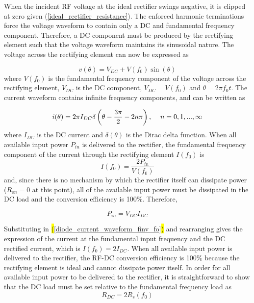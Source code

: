 When the incident RF voltage at the ideal rectifier swings negative, it is clipped at zero given (\ref{ideal_rectifier_resistance}).  The enforced harmonic terminations force the voltage waveform to contain only a DC and fundamental frequency component. Therefore, a DC component must be produced by the rectifying element such that the voltage waveform maintains its sinusoidal nature.  The voltage across the rectifying element can now be expressed as

\begin{equation}\label{diode_voltage_waveform_B}
    v(\theta) = V_{DC} + V(f_0)\sin(\theta)
\end{equation}
where $V(f_0)$ is the fundamental frequency component of the voltage across the rectifying element, $V_{DC}$ is the DC component, $V_{DC} = V(f_0)$ and $\theta = 2\pi f_0 t$. The current waveform contains infinite frequency components, and can be written as

\begin{equation}\label{diode_current_waveform_time_domain}
    i(\theta) = 2\pi I_{DC}\delta\left(\theta-\frac{3\pi}{2} - 2n\pi\right), \hskip 1pc n = 0,1,...,\infty
\end{equation}
where $I_{DC}$ is the DC current and $\delta(\theta)$ is the Dirac delta function. When all available input power $P_{in}$ is delivered to the rectifier, the fundamental frequency component of the current through the rectifying element $I(f_0)$ is
\begin{equation}\label{diode_current_waveform_finv_fo}
I(f_0) = \frac{2P_{in}}{V(f_0)}
\end{equation}
and, since there is no mechanism by which the rectifier itself can dissipate power ($R_{on}=0$ at this point), all of the available input power must be dissipated in the DC load and the conversion efficiency is 100\%. Therefore,

\begin{equation}\label{dcload}
P_{in} = V_{DC}I_{DC}
\end{equation}

Substituting in \hl{(}\ref{diode_current_waveform_finv_fo}\hl{)} and rearranging gives the expression of the current at the fundamental input frequency and the DC rectified current, which is $I(f_0) = 2I_{DC}$. When all available input power is delivered to the rectifier, the RF-DC conversion efficiency is 100\% because the rectifying element is ideal and cannot dissipate power itself.  In order for all available input power to be delivered to the rectifier, it is straightforward to show that the DC load must be set relative to the fundamental frequency load as
\begin{equation}\label{ideal_DC_load}
R_{DC} = 2R_s(f_0)
\end{equation}

